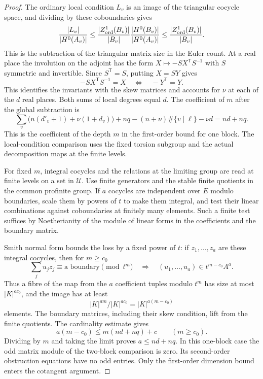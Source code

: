 \begin{proof}
The ordinary local condition \(L_v\)
is an image of the triangular cocycle space, and dividing
by these coboundaries gives
\[
 \frac{|L_v|}{|H^0(A_v)|}
       \le \frac{|Z^1_{\rm ord}(B_v)|}{|B_v|}
                       \frac{|H^0(B_v)|}{|H^0(A_v)|}
       \le \frac{|Z^1_{\rm ord}(B_v)|}{|B_v|}.
\]
This is the subtraction of the triangular matrix size in
the Euler count.
At a real place the involution on the adjoint has
the form \(X\mapsto -S X^{\mathsf T} S^{-1}\) with \(S\)
symmetric and invertible. Since \(S^{\mathsf T}=S\), putting \(X=SY\) gives 
\[
 -SX^{\mathsf T}S^{-1}=X\quad\Longleftrightarrow\quad -Y^{\mathsf T}=Y.
\]
 This identifies the invariants with the skew matrices and accounts for \(\nu\) at each of the \(d\) real places.
Both sums of local degrees equal \(d\). The coefficient of
\(m\) after the global subtraction is
\[
 \sum_v\big(n(d'_v+1)+\nu(1+d_v)\big)
          +nq-(n+\nu)\#\{v\mid\ell\}-\nu d=nd+nq .
\]
This is the coefficient of the depth \(m\) in the first-order bound for one block. The local-condition comparison uses
the fixed torsion subgroup and the actual
decomposition maps at the finite levels.

For fixed \(m\), integral cocycles and the
relations at the limiting group are read at finite
levels on a set in \(\mathcal U\). Use finite generators and the
stable finite quotients in the common profinite group.
If \(a\) cocycles are independent over \(E\) modulo
boundaries, scale them by powers of \(t\) to make them
integral, and test their linear combinations against
coboundaries at finitely many elements. Such a finite
test suffices by Noetherianity of the module of linear
forms in the coefficients and the boundary matrix.

Smith normal form bounds the loss by a fixed power of
\(t\): if \(z_1,\ldots,z_a\) are these integral cocycles, then for \(m\ge c_0\)
\[
 \sum_j u_jz_j\equiv\text{a boundary}\pmod{t^m}\quad\Longrightarrow\quad(u_1,\ldots,u_a)\in t^{m-c_0}A^a.
\]
Thus a fibre of the map from the \(a\) coefficient tuples modulo \(t^m\) has size at most \(|K|^{a c_0}\), and the image has at least
\[
 |K|^{am}/|K|^{a c_0}=|K|^{a(m-c_0)}
\]
elements. The boundary matrices,
including their skew condition, lift from the finite
quotients. The cardinality estimate gives
\[
        a(m-c_0)\le m(nd+nq)+c \qquad(m\ge c_0).
\]
Dividing by \(m\) and taking the limit proves \(a\le nd+nq\). In this one-block case
the odd matrix module of the two-block comparison
is zero. Its second-order obstruction equations have
no odd entries. Only the first-order dimension bound
enters the cotangent argument.


\end{proof}
